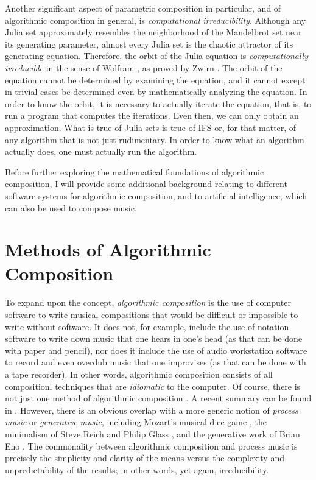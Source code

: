 \documentclass[11pt]{scrartcl}
\begin{document}
Another significant aspect of parametric composition in particular, and of algorithmic composition in general, is \emph{computational irreducibility}. Although any Julia set approximately resembles the neighborhood of the Mandelbrot set near its generating parameter, almost every Julia set is the chaotic attractor of its generating equation. Therefore, the orbit of the Julia equation is \emph{computationally irreducible} in the sense of Wolfram \parencite{wolfram1985undecidability}, as proved by Zwirn \parencite{zwirn2015computational}. The orbit of the equation cannot be determined by examining the equation, and it cannot except in trivial cases be determined even by mathematically analyzing the equation. In order to know the orbit, it is necessary to actually iterate the equation, that is, to run a program that computes the iterations. Even then, we can only obtain an approximation. What is true of Julia sets is true of IFS or, for that matter, of any algorithm that is not just rudimentary. In order to know what an algorithm actually does, one must actually run the algorithm.

Before further exploring the mathematical foundations of algorithmic composition, I will provide some additional background relating to different software systems for algorithmic composition, and to artificial intelligence, which can also be used to compose music.

\section*{Methods of Algorithmic Composition}

To expand upon the concept, \emph{algorithmic composition} is the use of computer software to write musical compositions that would be difficult or impossible to write without software. It does not, for example, include the use of notation software to write down music that one hears in one's head (as that can be done with paper and pencil), nor does it include the use of audio workstation software to record and even overdub music that one improvises (as that can be done with a tape recorder). In other words, algorithmic composition consists of all compositionl techniques that are \emph{idiomatic }to the computer. Of course, there is not just one method of algorithmic composition \parencite{fernandez2013ai, arizanet}. A recent summary can be found in \parencite{mclean2018oxford}. However, there is an obvious overlap with a more generic notion of \emph{process music} or \emph{generative music}, including Mozart's musical dice game \parencite{humdrumdice}, the minimalism of Steve Reich \parencite{reichprocess, 10.2307/832600} and Philip Glass \parencite{potter2002four, glass2015words}, and the generative work of Brian Eno \parencite{eno1996generative}. The commonality between algorithmic composition and process music is precisely the simplicity and clarity of the means versus the complexity and unpredictability of the results; in other words, yet again, irreducibility. 
\end{document}
